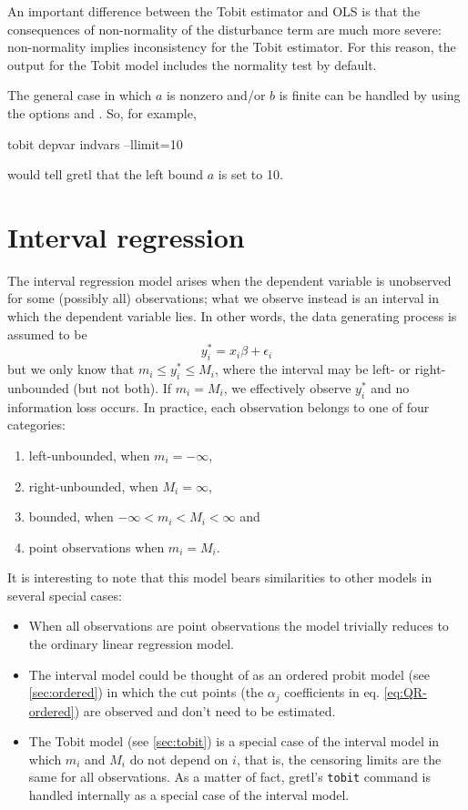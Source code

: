 An important difference between the Tobit estimator and OLS is that
the consequences of non-normality of the disturbance term are much
more severe: non-normality implies inconsistency for the Tobit
estimator. For this reason, the output for the Tobit model includes
the \cite{chesher-irish87} normality test by default.

The general case in which $a$ is nonzero and/or $b$ is finite can be
handled by using the options  and . So,
for example,
\begin{code}
tobit depvar indvars --llimit=10
\end{code}
would tell gretl that the left bound $a$ is set to 10.

\section{Interval regression}
\label{sec:intreg}

The interval regression model arises when the dependent variable is
unobserved for some (possibly all) observations; what we observe
instead is an interval in which the dependent variable lies.  In other
words, the data generating process is assumed to be
\[
  y^*_i = x_i \beta + \epsilon_i
\] 
but we only know that $m_i \le y^*_i \le M_i$, where the interval may
be left- or right-unbounded (but not both). If $m_i = M_i$, we
effectively observe $y^*_i$ and no information loss occurs. In
practice, each observation belongs to one of four categories:
\begin{enumerate}
\item left-unbounded, when $m_i = -\infty$,
\item right-unbounded, when $M_i = \infty$,
\item bounded, when $-\infty < m_i < M_i <\infty$ and
\item point observations when $m_i = M_i$.
\end{enumerate}

It is interesting to note that this model bears similarities to other
models in several special cases:
\begin{itemize}
\item When all observations are point observations the model trivially
  reduces to the ordinary linear regression model.
\item The interval model could be thought of as an ordered probit
  model (see \ref{sec:ordered}) in which the cut points (the
  $\alpha_j$ coefficients in eq. \ref{eq:QR-ordered}) are observed and
  don't need to be estimated.
\item The Tobit model (see \ref{sec:tobit}) is a special case of the
  interval model in which $m_i$ and $M_i$ do not depend on $i$, that
  is, the censoring limits are the same for all observations. As a
  matter of fact, gretl's \texttt{tobit} command is handled
  internally as a special case of the interval model.
\end{itemize}

